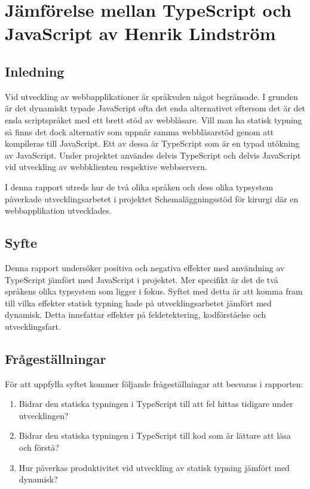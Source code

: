 \chapter{Jämförelse mellan TypeScript och JavaScript av Henrik Lindström}

\section{Inledning}
Vid utveckling av webbapplikationer är språkvalen något begränsade. I grunden är det dynamiskt typade JavaScript ofta det enda alternativet eftersom det är det enda scriptspråket med ett brett stöd av webbläsare. Vill man ha statisk typning så finns det dock alternativ som uppnår samma webbläsarstöd genom att kompileras till JavaScript. Ett av dessa är TypeScript som är en typad utökning av JavaScript. Under projektet användes delvis TypeScript och delvis JavaScript vid utveckling av webbklienten respektive webbservern.

I denna rapport utreds hur de två olika språken och dess olika typsystem påverkade utvecklingsarbetet i projektet Schemaläggningsstöd för kirurgi där en webbapplikation utvecklades.
\section{Syfte}
Denna rapport undersöker positiva och negativa effekter med användning av TypeScript jämfört med JavaScript i projektet. Mer specifikt är det de två språkens olika typsystem som ligger i fokus. Syftet med detta är att komma fram till vilka effekter statisk typning hade på utvecklingsarbetet jämfört med dynamisk. Detta innefattar effekter på feldetektering, kodförståelse och utvecklingsfart. 

\section{Frågeställningar}
För att uppfylla syftet kommer följande frågeställningar att besvaras i rapporten:
\begin{enumerate}
\item Bidrar den statiska typningen i TypeScript till att fel hittas tidigare under utvecklingen?
\item Bidrar den statiska typningen i TypeScript till kod som är lättare att läsa och förstå?
\item Hur påverkas produktivitet vid utveckling av statisk typning jämfört med dynamisk?
\end{enumerate}
